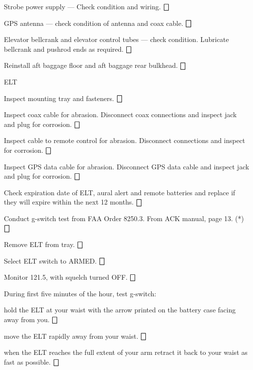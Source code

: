 \begin{enumerate*}
\begin{enumerate*}
		\item Strobe power supply --- Check condition and wiring. \dotfill $\bigbox$
		\item GPS antenna --- check condition of antenna and coax cable. \dotfill $\bigbox$
		\item Elevator bellcrank and elevator control tubes --- check condition.  Lubricate bellcrank and pushrod ends as required.  \dotfill $\bigbox$
		\item Reinstall aft baggage floor and aft baggage rear bulkhead.  \dotfill $\bigbox$
	\end{enumerate*}
  \item{ELT} 
  \begin{enumerate*}
  	\item Inspect mounting tray and fasteners.  \dotfill $\bigbox$
  	\item Inspect coax cable for abrasion. Disconnect coax connections and inspect jack and plug for corrosion.  \dotfill $\bigbox$
  	\item Inspect cable to remote control for abrasion. Disconnect connections and inspect for corrosion.  \dotfill $\bigbox$
  	\item Inspect GPS data cable for abrasion. Disconnect GPS data cable and inspect jack and plug for corrosion. \dotfill $\bigbox$
  	\item Check expiration date of ELT, aural alert and remote batteries and replace if they will expire within the next 12 months.  \dotfill $\bigbox$
  	\item Conduct g-switch test from FAA Order 8250.3. From ACK manual, page 13. (*) \dotfill $\bigbox$
  	\begin{enumerate*}
  		\item Remove ELT from tray.  \dotfill $\bigbox$
  		\item Select ELT switch to ARMED.  \dotfill $\bigbox$
  		\item Monitor 121.5, with squelch turned OFF.  \dotfill $\bigbox$
  		\item During first five minutes of the hour, test g-switch: 
  		\begin{enumerate*}
  		  \item hold the ELT at your waist with the arrow printed on the battery case facing away from you.  \dotfill $\bigbox$
  		  \item move the ELT rapidly away from your waist.  \dotfill $\bigbox$
  		  \item when the ELT reaches the full extent of your arm retract it back to your waist as fast as possible. \dotfill $\bigbox$

\end{enumerate*}
\end{enumerate*}
\end{enumerate*}
\end{enumerate*}
